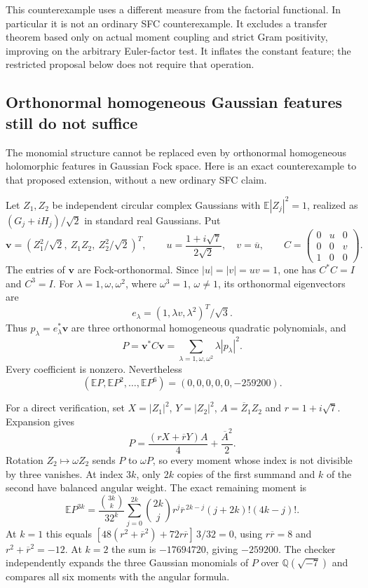 \documentclass[11pt]{article}
\begin{document}
This counterexample uses a different measure from the factorial
functional. In particular it is not an ordinary SFC counterexample.
It excludes a transfer theorem based only on actual moment coupling
and strict Gram positivity, improving on the arbitrary Euler-factor
test. It inflates the constant feature; the restricted proposal below
does not require that operation.


\subsection{Orthonormal homogeneous Gaussian features still do not suffice}
The monomial structure cannot be replaced even by orthonormal homogeneous
holomorphic features in Gaussian Fock space. Here is an exact counterexample
to that proposed extension, without a new ordinary SFC claim.

Let $Z_1,Z_2$ be independent circular complex Gaussians with
$\mathbb E|Z_j|^2=1$, realized as $(G_j+iH_j)/\sqrt2$ in standard real
Gaussians. Put
\[
 \mathbf v=(Z_1^2/\sqrt2,\ Z_1Z_2,\ Z_2^2/\sqrt2)^T,\qquad
 u=\frac{1+i\sqrt7}{2\sqrt2},\quad v=\overline u,\qquad
 C=\begin{pmatrix}0&u&0\\0&0&v\\1&0&0\end{pmatrix}.
\]
The entries of $\mathbf v$ are Fock-orthonormal. Since $|u|=|v|=uv=1$,
one has $C^*C=I$ and $C^3=I$. For $\lambda=1,\omega,\omega^2$,
where $\omega^3=1$, $\omega\ne1$, its orthonormal eigenvectors are
\[
 e_\lambda=(1,\lambda v,\lambda^2)^T/\sqrt3.
\]
Thus $p_\lambda=e_\lambda^*\mathbf v$ are three orthonormal homogeneous
quadratic polynomials, and
\[
 P=\mathbf v^*C\mathbf v=\sum_{\lambda=1,\omega,\omega^2}
                         \lambda|p_\lambda|^2.
\]
Every coefficient is nonzero. Nevertheless
\[
 (\mathbb EP,\mathbb EP^2,\ldots,\mathbb EP^6)
       =(0,0,0,0,0,-259200).
\]

For a direct verification, set $X=|Z_1|^2$, $Y=|Z_2|^2$,
$A=\overline Z_1Z_2$ and $r=1+i\sqrt7$. Expansion gives
\[
 P=\frac{(rX+\overline rY)A}{4}+\frac{\overline A^2}{2}.
\]
Rotation $Z_2\mapsto\omega Z_2$ sends $P$ to $\omega P$, so every
moment whose index is not divisible by three vanishes. At index $3k$,
only $2k$ copies of the first summand and $k$ of the second have
balanced angular weight. The exact remaining moment is
\[
 \mathbb EP^{3k}
 =\frac{\binom{3k}{k}}{32^k}
   \sum_{j=0}^{2k}\binom{2k}{j}
       r^j\overline r^{\,2k-j}(j+2k)!(4k-j)!.
\]
At $k=1$ this equals
$[48(r^2+\overline r^2)+72r\overline r]\,3/32=0$,
using $r\overline r=8$ and $r^2+\overline r^2=-12$.
At $k=2$ the sum is $-17694720$, giving $-259200$.
The checker independently expands the three Gaussian monomials of
$P$ over $\mathbb Q(\sqrt{-7})$ and compares all six moments with
the angular formula.
\end{document}
